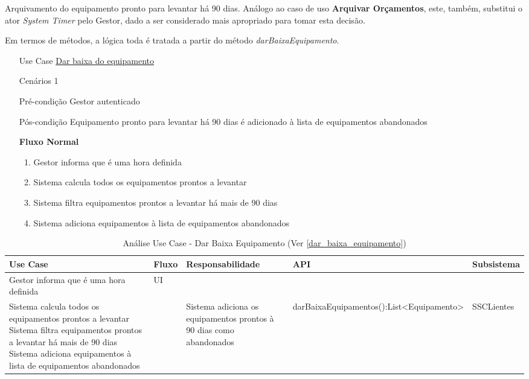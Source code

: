 \documentclass[../relatorio.tex]{subfiles}
\begin{document}
Arquivamento do equipamento pronto para levantar há 90 dias.
Análogo ao caso de uso \textbf{Arquivar Orçamentos}, este, também, substitui o ator \textit{System Timer}
pelo Gestor, dado a ser considerado mais apropriado para tomar esta decisão.

Em termos de métodos, a lógica toda é tratada a partir do método \textit{darBaixaEquipamento}.
\begin{itemize}
    \item[Use Case] {\underline{Dar baixa do equipamento}}
    \item[Cenários] {1}
    \item[Pré-condição] {Gestor autenticado}
    \item[Pós-condição] {Equipamento pronto para levantar há 90 dias é adicionado à lista de equipamentos abandonados}
          \begin{flushleft}
              \textbf{Fluxo Normal}
          \end{flushleft}
          \begin{enumerate}
              \item Gestor informa que é uma hora definida
              \item Sistema calcula todos os equipamentos prontos a levantar
              \item Sistema filtra equipamentos prontos a levantar há mais de 90 dias
              \item Sistema adiciona equipamentos à lista de equipamentos abandonados
          \end{enumerate}
\end{itemize}
\begin{landscape}
    \begin{table}[!h]
        \centering
        \begin{tabular}{|p{5cm}|p{1cm}|p{4cm}|p{6cm}|p{3cm}|}
            \hline
            \rowcolor{gray!20!white}
            Use Case & Fluxo & Responsabilidade & API & Subsistema \\
            \hline
            \rowcolor{yellow}
            Gestor informa que é uma hora definida
                     & UI
                     &
                     &
                     &
            \\
            \hline
            Sistema calcula todos os equipamentos prontos a levantar 
            Sistema filtra equipamentos prontos a levantar há mais de 90 dias
            Sistema adiciona equipamentos à lista de equipamentos abandonados
                     & 
                     & Sistema adiciona os equipamentos prontos à 90 dias como abandonados
                     & darBaixaEquipamentos():List<Equipamento>
                     & SSCLientes
            \\
            \hline
        \end{tabular}
        \caption{Análise Use Case - Dar Baixa Equipamento (Ver \ref{dar_baixa_equipamento})}
    \end{table}
\end{landscape}
\end{document}
